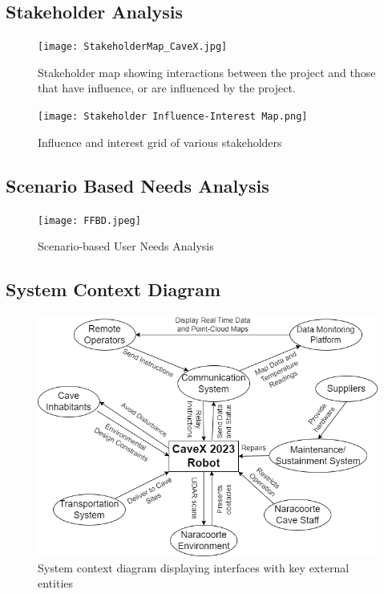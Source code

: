 \newpage
\subsection{Stakeholder Analysis}
\label{app:stakeholder}

\begin{figure}[H]
        \centering
        \texttt{[image: StakeholderMap\_CaveX.jpg]}
        \caption{Stakeholder map showing interactions between the project and those that have influence, or are influenced by the project.}
\end{figure}

\begin{figure}[H]
        \centering
        \texttt{[image: Stakeholder Influence-Interest Map.png]}
        \caption{Influence and interest grid of various stakeholders}
\end{figure}

\newpage
\subsection{Scenario Based Needs Analysis}
\label{app:scenario-based-needs-analysis}

\begin{figure}[H]
        \centering
        \texttt{[image: FFBD.jpeg]}
        \caption{Scenario-based User Needs Analysis}
        \label{fig:FFBD}
\end{figure}

\newpage
\subsection{System Context Diagram}
\begin{figure}[H]
    \centering
    \includegraphics[scale=0.5]{images/system_context.drawio.png}
    \caption{System context diagram displaying interfaces with key external entities}
    \label{fig:system_context}
\end{figure}

